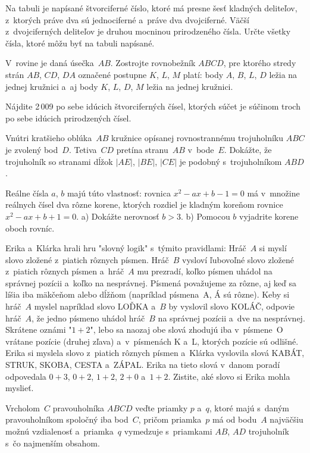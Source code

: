 {%
Na tabuli je napísané štvorciferné číslo, ktoré má presne šesť kladných deliteľov, z~ktorých práve dva sú jednociferné a~práve dva dvojciferné. Väčší z~dvojciferných deliteľov je druhou mocninou prirodzeného čísla. Určte všetky čísla, ktoré môžu byť na tabuli napísané.}

{%
V~rovine je daná úsečka~$AB$. Zostrojte rovnobežník $ABCD$, pre ktorého stredy strán $AB$, $CD$, $DA$ označené postupne $K$, $L$, $M$ platí: body $A$, $B$, $L$, $D$ ležia na jednej kružnici a~aj body $K$, $L$, $D$, $M$ ležia na jednej kružnici.}

{%
Nájdite 2\,009 po sebe idúcich štvorciferných čísel, ktorých súčet je súčinom troch po sebe idúcich prirodzených čísel.}

{%
Vnútri kratšieho oblúka~$AB$ kružnice opísanej rovnostrannému trojuholníku $ABC$ je zvolený bod~$D$. Tetiva~$CD$ pretína stranu~$AB$ v~bode~$E$. Dokážte, že trojuholník so stranami dĺžok $|AE|$, $|BE|$, $|CE|$ je podobný s~trojuholníkom $ABD$.}

{%
Reálne čísla $a$, $b$ majú túto vlastnosť: rovnica $x^2-ax+b-1=0$  má v~množine reálnych čísel dva rôzne korene, ktorých rozdiel je kladným koreňom rovnice $x^2-ax+b+1=0$.
\ite a) Dokážte nerovnosť $b>3$.
\ite b) Pomocou $b$ vyjadrite korene oboch rovníc.}

{%
Erika a~Klárka hrali hru "slovný logik" s~týmito pravidlami: Hráč~$A$ si myslí slovo zložené z~piatich rôznych písmen. Hráč~$B$ vysloví ľubovoľné slovo zložené z~piatich rôznych písmen a~hráč~$A$ mu prezradí, koľko písmen uhádol na správnej pozícii a~koľko na nesprávnej. Písmená považujeme za rôzne, aj keď sa líšia iba mäkčeňom alebo dĺžňom (napríklad písmena~A, Á sú rôzne). Keby si hráč~$A$ myslel napríklad slovo LOĎKA a~$B$ by vyslovil slovo KOLÁČ, odpovie hráč~$A$, že jedno písmeno uhádol hráč~$B$ na správnej pozícii a~dve na nesprávnej. Skrátene oznámi "$1+2$", lebo sa naozaj obe slová zhodujú iba v~písmene~O vrátane pozície (druhej zľava) a~v~písmenách K a~L, ktorých pozície sú odlišné. Erika si myslela slovo z~piatich rôznych písmen a~Klárka vyslovila slová KABÁT, STRUK, SKOBA, CESTA a~ZÁPAL. Erika na tieto slová v~danom poradí odpovedala $0+3$, $0+2$, $1+2$, $2+0$ a~$1+2$. Zistite, aké slovo si Erika mohla myslieť.}

{%
Vrcholom~$C$ pravouholníka $ABCD$ veďte priamky $p$ a~$q$, ktoré majú s~daným pravouholníkom spoločný iba bod~$C$, pričom priamka~$p$ má od bodu~$A$ najväčšiu možnú vzdialenosť a~priamka~$q$ vymedzuje s~priamkami $AB$, $AD$ trojuholník s~čo najmenším obsahom.}

